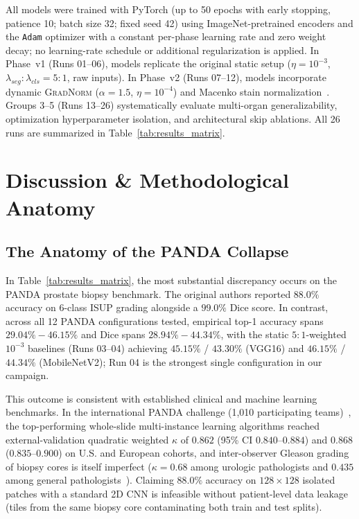 \documentclass[runningheads]{llncs}
\begin{document}
All models were trained with PyTorch (up to 50 epochs with early stopping, patience 10; batch size 32; fixed seed 42) using ImageNet-pretrained encoders and the \texttt{Adam} optimizer with a constant per-phase learning rate and zero weight decay; no learning-rate schedule or additional regularization is applied. In Phase~v1 (Runs 01--06), models replicate the original static setup ($\eta=10^{-3}$, $\lambda_{seg}:\lambda_{cls}=5:1$, raw inputs). In Phase~v2 (Runs 07--12), models incorporate dynamic \textsc{GradNorm} ($\alpha=1.5$, $\eta=10^{-4}$) and Macenko stain normalization~\cite{macenko2009method}. Groups 3--5 (Runs 13--26) systematically evaluate multi-organ generalizability, optimization hyperparameter isolation, and architectural skip ablations. All 26 runs are summarized in Table~\ref{tab:results_matrix}.

\section{Discussion \& Methodological Anatomy}

\subsection{The Anatomy of the PANDA Collapse}\label{sec:panda}
In Table~\ref{tab:results_matrix}, the most substantial discrepancy occurs on the PANDA prostate biopsy benchmark. The original authors reported $88.0\%$ accuracy on 6-class ISUP grading alongside a $99.0\%$ Dice score. In contrast, across all 12 PANDA configurations tested, empirical top-1 accuracy spans $29.04\%-46.15\%$ and Dice spans $28.94\%-44.34\%$, with the static $5{:}1$-weighted $10^{-3}$ baselines (Runs 03--04) achieving $45.15\%$ / $43.30\%$ (VGG16) and $46.15\%$ / $44.34\%$ (MobileNetV2); Run 04 is the strongest single configuration in our campaign.

This outcome is consistent with established clinical and machine learning benchmarks. In the international PANDA challenge (1,010 participating teams)~\cite{bulten2022artificial}, the top-performing whole-slide multi-instance learning algorithms reached external-validation quadratic weighted $\kappa$ of $0.862$ (95\% CI $0.840$--$0.884$) and $0.868$ ($0.835$--$0.900$) on U.S. and European cohorts, and inter-observer Gleason grading of biopsy cores is itself imperfect ($\kappa = 0.68$ among urologic pathologists and $0.435$ among general pathologists~\cite{allsbrook2001urologic,allsbrook2001general}). Claiming $88.0\%$ accuracy on $128 \times 128$ isolated patches with a standard 2D CNN is infeasible without patient-level data leakage (tiles from the same biopsy core contaminating both train and test splits).
\end{document}

